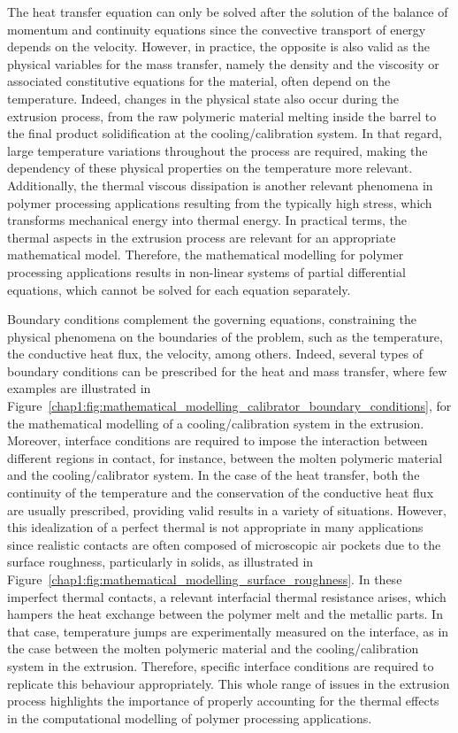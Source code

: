 The heat transfer equation can only be solved after the solution of the balance of momentum and continuity equations since the convective transport of energy depends on the velocity.
However, in practice, the opposite is also valid as the physical variables for the mass transfer, namely the density and the viscosity or associated constitutive equations for the material, often depend on the temperature.
Indeed, changes in the physical state also occur during the extrusion process, from the raw polymeric material melting inside the barrel to the final product solidification at the cooling/calibration system.
In that regard, large temperature variations throughout the process are required, making the dependency of these physical properties on the temperature more relevant.
Additionally, the thermal viscous dissipation is another relevant phenomena in polymer processing applications resulting from the typically high stress, which transforms mechanical energy into thermal energy.
In practical terms, the thermal aspects in the extrusion process are relevant for an appropriate mathematical model.
Therefore, the mathematical modelling for polymer processing applications results in non-linear systems of partial differential equations, which cannot be solved for each equation separately.

Boundary conditions complement the governing equations, constraining the physical phenomena on the boundaries of the problem, such as the temperature, the conductive heat flux, the velocity, among others.
Indeed, several types of boundary conditions can be prescribed for the heat and mass transfer, where few examples are illustrated in Figure~\ref{chap1:fig:mathematical_modelling_calibrator_boundary_conditions}, for the mathematical modelling of a cooling/calibration system in the extrusion.
Moreover, interface conditions are required to impose the interaction between different regions in contact, for instance, between the molten polymeric material and the cooling/calibrator system.
In the case of the heat transfer, both the continuity of the temperature and the conservation of the conductive heat flux are usually prescribed, providing valid results in a variety of situations.
However, this idealization of a perfect thermal is not appropriate in many applications since realistic contacts are often composed of microscopic air pockets due to the surface roughness, particularly in solids, as illustrated in Figure~\ref{chap1:fig:mathematical_modelling_surface_roughness}.
In these imperfect thermal contacts, a relevant interfacial thermal resistance arises, which hampers the heat exchange between the polymer melt and the metallic parts.
In that case, temperature jumps are experimentally measured on the interface, as in the case between the molten polymeric material and the cooling/calibration system in the extrusion.
Therefore, specific interface conditions are required to replicate this behaviour appropriately.
This whole range of issues in the extrusion process highlights the importance of properly accounting for the thermal effects in the computational modelling of polymer processing applications.

